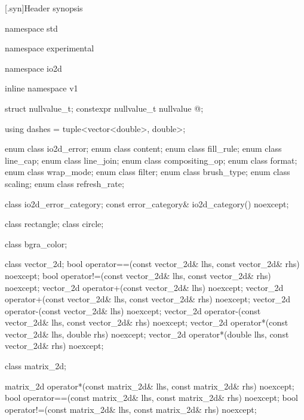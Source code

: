 [\iotwod.syn]{Header  synopsis}

%
\begin{codeblock}

namespace std { namespace experimental {
  namespace io2d { inline namespace v1 {

  struct nullvalue_t;
  constexpr nullvalue_t nullvalue{ @\impdef@ };

  using dashes = tuple<vector<double>, double>;

  enum class io2d_error;
  enum class content;
  enum class fill_rule;
  enum class line_cap;
  enum class line_join;
  enum class compositing_op;
  enum class format;
  enum class wrap_mode;
  enum class filter;
  enum class brush_type;
  enum class scaling;
  enum class refresh_rate;

  class io2d_error_category;
  const error_category& io2d_category() noexcept;

  class rectangle;
  class circle;

  class bgra_color;

  class vector_2d;
  bool operator==(const vector_2d& lhs, const vector_2d& rhs) noexcept;
  bool operator!=(const vector_2d& lhs, const vector_2d& rhs) noexcept;
  vector_2d operator+(const vector_2d& lhs) noexcept;
  vector_2d operator+(const vector_2d& lhs, const vector_2d& rhs) noexcept;
  vector_2d operator-(const vector_2d& lhs) noexcept;
  vector_2d operator-(const vector_2d& lhs, const vector_2d& rhs) noexcept;
  vector_2d operator*(const vector_2d& lhs, double rhs) noexcept;
  vector_2d operator*(double lhs, const vector_2d& rhs) noexcept;

  class matrix_2d;

  matrix_2d operator*(const matrix_2d& lhs, const matrix_2d& rhs) noexcept;
  bool operator==(const matrix_2d& lhs, const matrix_2d& rhs) noexcept;
  bool operator!=(const matrix_2d& lhs, const matrix_2d& rhs) noexcept;

}}}}
\end{codeblock}

